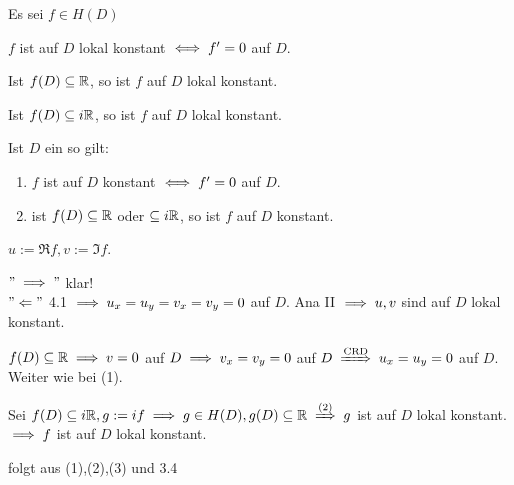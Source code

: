 \documentclass[a4paper,twoside,DIV15,BCOR12mm]{scrbook}
\def\gdw{\equizu}
\def\gdw{\equizu}
\begin{document}
\begin{folgerung}%
Es sei $f \in H(D)$
\begin{liste}
\item $f$ ist auf $D$ lokal konstant $\gdw f' = 0$ auf $D$.
\item Ist $f(D) \subseteq \mathbb{R}$, so ist $f$ auf $D$ lokal konstant.
\item Ist $f(D) \subseteq  i\mathbb{R}$, so ist $f$ auf $D$ lokal konstant.
\item Ist $D$ ein  so gilt:
\begin{enumerate} 
\item $f$ ist auf $D$ konstant $\gdw f' = 0$ auf $D$.
\item ist $f(D) \subseteq \mathbb{R}$ oder $\subseteq i\mathbb{R}$, so ist $f$ auf $D$ konstant.
\end{enumerate}
\end{liste}
\end{folgerung}


\begin{beweis}
$u:=\Re f, v:=\Im f$.
\begin{liste}
\item $"\implies "$ klar! \\
$"\Leftarrow "$ 4.1 $\implies u_x = u_y = v_x = v_y = 0$ auf $D$. Ana II $\implies u,v$ sind auf $D$ lokal konstant.
\item $f(D) \subseteq \mathbb{R} \implies v = 0$ auf $D \implies v_x = v_y = 0$ auf $D \folgtnach{CRD} u_x = u_y = 0$ auf $D$. Weiter wie bei (1).
\item Sei $f(D) \subseteq i\MdR, g:=if \folgt g \in H(D), g(D) \subseteq \MdR \folgtnach{(2)} g$ ist auf $D$ lokal konstant. $\implies f$ ist auf $D$ lokal konstant.
\item folgt aus (1),(2),(3) und 3.4
\end{liste}
\end{beweis}
\end{document}
